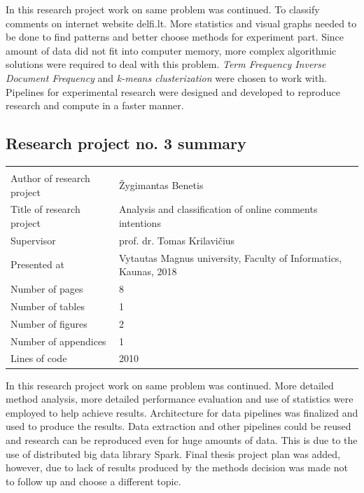 \documentclass[a4paper,12pt]{article}
\begin{document}
	\vspace{5mm}
	
	In this research project work on same problem was continued. To classify comments on internet website delfi.lt. More statistics  and visual graphs needed to be done to find patterns and better choose methods for experiment part. Since amount of data did not fit into computer memory, more complex algorithmic solutions were required to deal with this problem. \textit{Term Frequency Inverse Document Frequency} and \textit{k-means clusterization} were chosen to work with. Pipelines for experimental research were designed and developed to reproduce research and compute in a faster manner.
	
	\clearpage
	
	
	\subsection{Research project no. 3 summary}
	
	
	\noindent
	\begin{center}
		\begin{tabular}{L{4.5cm} L{8cm}}
			\\ 
			Author of research project & Žygimantas Benetis \\
			Title of research project & Analysis and classification of online comments intentions\\
			Supervisor & prof. dr. Tomas Krilavičius\\
			Presented at & Vytautas Magnus university, Faculty of Informatics, Kaunas, 2018\\
			Number of pages & 8\\
			Number of tables & 1\\
			Number of figures & 2\\
			Number of appendices & 1\\
			Lines of code & 2010\\
		\end{tabular}
	\end{center} 
	
	\vspace{5mm}
	
	In this research project work on same problem was continued. More detailed method analysis, more detailed performance evaluation and use of statistics were employed to help achieve results. Architecture for data pipelines was finalized and used to produce the results. Data extraction and other pipelines could be reused and research can be reproduced even for huge amounts of data. This is due to the use of distributed big data library Spark. Final thesis project plan was added, however, due to lack of results produced by the methods decision was made not to follow up and choose a different topic.
	
\end{document}

